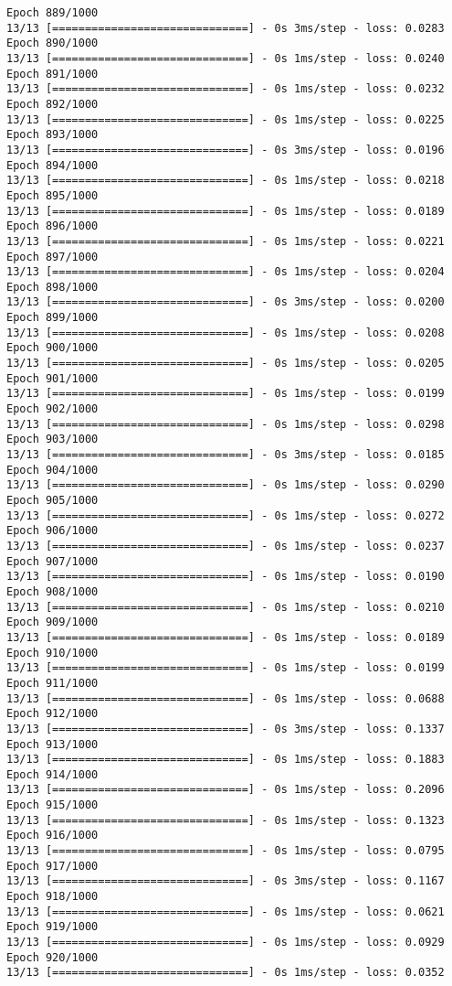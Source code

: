 \documentclass[11pt]{article}
\begin{document}
\begin{Verbatim}[commandchars=\\\{\}]
Epoch 889/1000
13/13 [==============================] - 0s 3ms/step - loss: 0.0283
Epoch 890/1000
13/13 [==============================] - 0s 1ms/step - loss: 0.0240
Epoch 891/1000
13/13 [==============================] - 0s 1ms/step - loss: 0.0232
Epoch 892/1000
13/13 [==============================] - 0s 1ms/step - loss: 0.0225
Epoch 893/1000
13/13 [==============================] - 0s 3ms/step - loss: 0.0196
Epoch 894/1000
13/13 [==============================] - 0s 1ms/step - loss: 0.0218
Epoch 895/1000
13/13 [==============================] - 0s 1ms/step - loss: 0.0189
Epoch 896/1000
13/13 [==============================] - 0s 1ms/step - loss: 0.0221
Epoch 897/1000
13/13 [==============================] - 0s 1ms/step - loss: 0.0204
Epoch 898/1000
13/13 [==============================] - 0s 3ms/step - loss: 0.0200
Epoch 899/1000
13/13 [==============================] - 0s 1ms/step - loss: 0.0208
Epoch 900/1000
13/13 [==============================] - 0s 1ms/step - loss: 0.0205
Epoch 901/1000
13/13 [==============================] - 0s 1ms/step - loss: 0.0199
Epoch 902/1000
13/13 [==============================] - 0s 1ms/step - loss: 0.0298
Epoch 903/1000
13/13 [==============================] - 0s 3ms/step - loss: 0.0185
Epoch 904/1000
13/13 [==============================] - 0s 1ms/step - loss: 0.0290
Epoch 905/1000
13/13 [==============================] - 0s 1ms/step - loss: 0.0272
Epoch 906/1000
13/13 [==============================] - 0s 1ms/step - loss: 0.0237
Epoch 907/1000
13/13 [==============================] - 0s 1ms/step - loss: 0.0190
Epoch 908/1000
13/13 [==============================] - 0s 1ms/step - loss: 0.0210
Epoch 909/1000
13/13 [==============================] - 0s 1ms/step - loss: 0.0189
Epoch 910/1000
13/13 [==============================] - 0s 1ms/step - loss: 0.0199
Epoch 911/1000
13/13 [==============================] - 0s 1ms/step - loss: 0.0688
Epoch 912/1000
13/13 [==============================] - 0s 3ms/step - loss: 0.1337
Epoch 913/1000
13/13 [==============================] - 0s 1ms/step - loss: 0.1883
Epoch 914/1000
13/13 [==============================] - 0s 1ms/step - loss: 0.2096
Epoch 915/1000
13/13 [==============================] - 0s 1ms/step - loss: 0.1323
Epoch 916/1000
13/13 [==============================] - 0s 1ms/step - loss: 0.0795
Epoch 917/1000
13/13 [==============================] - 0s 3ms/step - loss: 0.1167
Epoch 918/1000
13/13 [==============================] - 0s 1ms/step - loss: 0.0621
Epoch 919/1000
13/13 [==============================] - 0s 1ms/step - loss: 0.0929
Epoch 920/1000
13/13 [==============================] - 0s 1ms/step - loss: 0.0352

\end{Verbatim}
\end{document}
